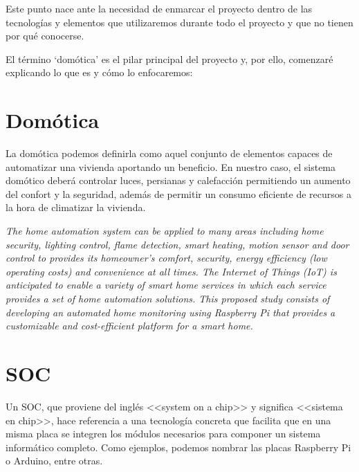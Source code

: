 
\label{cap:Conceptos teóricos}

Este punto nace ante la necesidad de enmarcar el proyecto dentro de las tecnologías y elementos que utilizaremos durante todo el proyecto y que no tienen por qué conocerse.

El término `domótica’ es el pilar principal del proyecto y, por ello, comenzaré explicando lo que es y cómo lo enfocaremos:

\section{Domótica}\label{concepto:Domótica}
La domótica podemos definirla como aquel conjunto de elementos capaces de automatizar una vivienda aportando un beneficio.
En nuestro caso, el sistema domótico deberá controlar luces, persianas y calefacción permitiendo un aumento del confort y la seguridad, además de permitir un consumo eficiente de recursos a la hora de climatizar la vivienda.

\begin{displayquote}
\textit{The home automation system can be applied to many areas including home security, lighting control, flame detection, smart heating, motion sensor and door control to provides its homeowner's comfort, security, energy efficiency (low operating costs) and convenience at all times. The Internet of Things (IoT) is anticipated to enable a variety of smart home services in which each service provides a set of home automation solutions. This proposed study consists of developing an automated home monitoring using Raspberry Pi that provides a customizable and cost-efficient platform for a smart home.}
\cite{inproceedings:CitaDomotica}
\end{displayquote}

\section{SOC}
Un SOC, que proviene del inglés <<system on a chip>> y significa <<sistema en chip>>, hace referencia a una tecnología concreta que facilita que en una misma placa se integren los módulos necesarios para componer un sistema informático completo.
Como ejemplos, podemos nombrar las placas Raspberry Pi o Arduino, entre otras.


